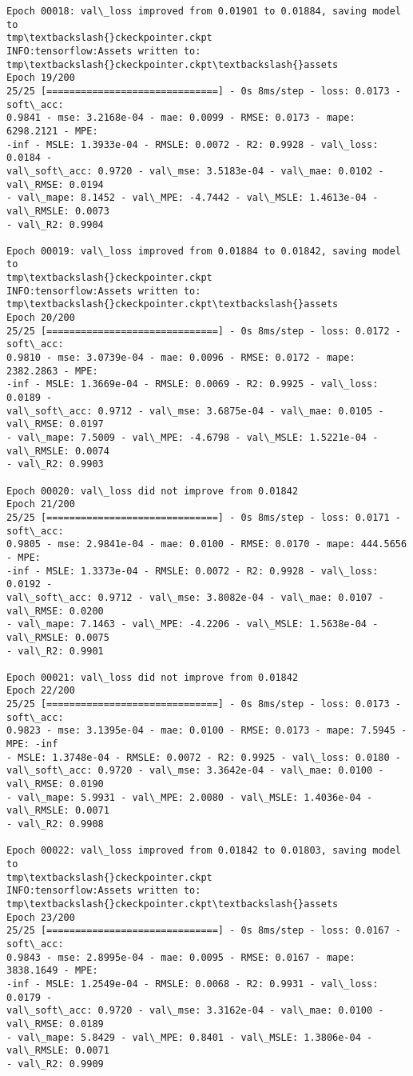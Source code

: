 \documentclass[11pt]{article}
\begin{document}
\begin{Verbatim}[commandchars=\\\{\}]
Epoch 00018: val\_loss improved from 0.01901 to 0.01884, saving model to
tmp\textbackslash{}ckeckpointer.ckpt
INFO:tensorflow:Assets written to: tmp\textbackslash{}ckeckpointer.ckpt\textbackslash{}assets
Epoch 19/200
25/25 [==============================] - 0s 8ms/step - loss: 0.0173 - soft\_acc:
0.9841 - mse: 3.2168e-04 - mae: 0.0099 - RMSE: 0.0173 - mape: 6298.2121 - MPE:
-inf - MSLE: 1.3933e-04 - RMSLE: 0.0072 - R2: 0.9928 - val\_loss: 0.0184 -
val\_soft\_acc: 0.9720 - val\_mse: 3.5183e-04 - val\_mae: 0.0102 - val\_RMSE: 0.0194
- val\_mape: 8.1452 - val\_MPE: -4.7442 - val\_MSLE: 1.4613e-04 - val\_RMSLE: 0.0073
- val\_R2: 0.9904

Epoch 00019: val\_loss improved from 0.01884 to 0.01842, saving model to
tmp\textbackslash{}ckeckpointer.ckpt
INFO:tensorflow:Assets written to: tmp\textbackslash{}ckeckpointer.ckpt\textbackslash{}assets
Epoch 20/200
25/25 [==============================] - 0s 8ms/step - loss: 0.0172 - soft\_acc:
0.9810 - mse: 3.0739e-04 - mae: 0.0096 - RMSE: 0.0172 - mape: 2382.2863 - MPE:
-inf - MSLE: 1.3669e-04 - RMSLE: 0.0069 - R2: 0.9925 - val\_loss: 0.0189 -
val\_soft\_acc: 0.9712 - val\_mse: 3.6875e-04 - val\_mae: 0.0105 - val\_RMSE: 0.0197
- val\_mape: 7.5009 - val\_MPE: -4.6798 - val\_MSLE: 1.5221e-04 - val\_RMSLE: 0.0074
- val\_R2: 0.9903

Epoch 00020: val\_loss did not improve from 0.01842
Epoch 21/200
25/25 [==============================] - 0s 8ms/step - loss: 0.0171 - soft\_acc:
0.9805 - mse: 2.9841e-04 - mae: 0.0100 - RMSE: 0.0170 - mape: 444.5656 - MPE:
-inf - MSLE: 1.3373e-04 - RMSLE: 0.0072 - R2: 0.9928 - val\_loss: 0.0192 -
val\_soft\_acc: 0.9712 - val\_mse: 3.8082e-04 - val\_mae: 0.0107 - val\_RMSE: 0.0200
- val\_mape: 7.1463 - val\_MPE: -4.2206 - val\_MSLE: 1.5638e-04 - val\_RMSLE: 0.0075
- val\_R2: 0.9901

Epoch 00021: val\_loss did not improve from 0.01842
Epoch 22/200
25/25 [==============================] - 0s 8ms/step - loss: 0.0173 - soft\_acc:
0.9823 - mse: 3.1395e-04 - mae: 0.0100 - RMSE: 0.0173 - mape: 7.5945 - MPE: -inf
- MSLE: 1.3748e-04 - RMSLE: 0.0072 - R2: 0.9925 - val\_loss: 0.0180 -
val\_soft\_acc: 0.9720 - val\_mse: 3.3642e-04 - val\_mae: 0.0100 - val\_RMSE: 0.0190
- val\_mape: 5.9931 - val\_MPE: 2.0080 - val\_MSLE: 1.4036e-04 - val\_RMSLE: 0.0071
- val\_R2: 0.9908

Epoch 00022: val\_loss improved from 0.01842 to 0.01803, saving model to
tmp\textbackslash{}ckeckpointer.ckpt
INFO:tensorflow:Assets written to: tmp\textbackslash{}ckeckpointer.ckpt\textbackslash{}assets
Epoch 23/200
25/25 [==============================] - 0s 8ms/step - loss: 0.0167 - soft\_acc:
0.9843 - mse: 2.8995e-04 - mae: 0.0095 - RMSE: 0.0167 - mape: 3838.1649 - MPE:
-inf - MSLE: 1.2549e-04 - RMSLE: 0.0068 - R2: 0.9931 - val\_loss: 0.0179 -
val\_soft\_acc: 0.9720 - val\_mse: 3.3162e-04 - val\_mae: 0.0100 - val\_RMSE: 0.0189
- val\_mape: 5.8429 - val\_MPE: 0.8401 - val\_MSLE: 1.3806e-04 - val\_RMSLE: 0.0071
- val\_R2: 0.9909


\end{Verbatim}
\end{document}
